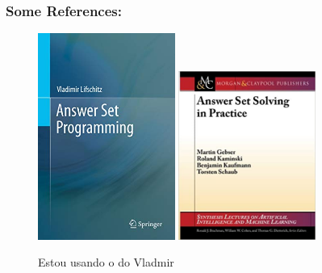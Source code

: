 \documentclass{beamer}
\begin{document}
\begin{frame}
	\frametitle{Some References:}
	
\begin{figure}[tbp]
  \centering
	 \includegraphics[width=0.4\textwidth , height=0.55\textheight]{cover_book_vladmir.jpg}
	 \includegraphics[width=0.4\textwidth , height=0.55\textheight]{cover_book_roland.jpg}
  \caption{Estou usando o do Vladmir}
	
	\end{figure}
\end{frame}
\end{document}
